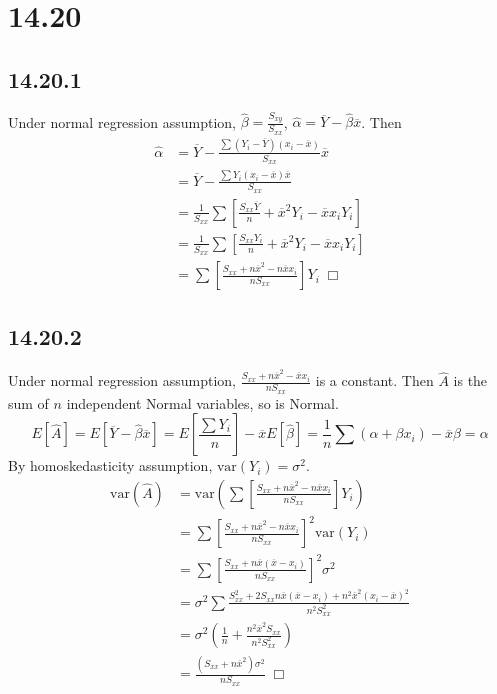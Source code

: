 \documentclass{article}
\begin{document}
\section*{14.20}
\subsection*{14.20.1}
Under normal regression assumption, $\hat{\beta} = \frac{S_{xy}}{S_{xx}}$, $\hat{\alpha} = \overline{Y} - \hat{\beta}\overline{x}$. Then
\begin{equation*}
\begin{split}
\hat{\alpha} &= \overline{Y} - \frac{\sum (Y_i-\overline{Y})(x_i-\overline{x})}{S_{xx}}\overline{x}\\
&= \overline{Y} - \frac{\sum Y_i(x_i-\overline{x})\overline{x}}{S_{xx}}\\
&= \frac{1}{S_{xx}}\sum \left[\frac{S_{xx}\overline{Y}}{n} +\overline{x}^2Y_i - \overline{x}x_iY_i \right]\\
&= \frac{1}{S_{xx}}\sum \left[\frac{S_{xx}Y_i}{n} +\overline{x}^2Y_i - \overline{x}x_iY_i \right]\\
&= \sum \left[\frac{S_{xx} + n\overline{x}^2 - n\overline{x}x_i}{nS_{xx}}\right]Y_i \; \Box
\end{split}
\end{equation*}
\subsection*{14.20.2}
Under normal regression assumption, $\frac{S_{xx} + n\overline{x}^2 - \overline{x}x_i}{nS_{xx}}$ is a constant. Then $\hat{A}$ is the sum of $n$ independent Normal variables, so is Normal.
$$E[\hat{A}] = E[\overline{Y}-\hat{\beta}\overline{x}] = E\left[\frac{\sum Y_i}{n}\right] - \overline{x}E[\hat{\beta}] = \frac{1}{n}\sum (\alpha + \beta x_i) - \overline{x}\beta = \alpha$$
By homoskedasticity assumption, $\mathrm{var}(Y_i) = \sigma^2$.
\begin{equation*}
\begin{split}
\mathrm{var}(\hat{A}) &= \mathrm{var}\left(\sum \left[\frac{S_{xx} + n\overline{x}^2 - n\overline{x}x_i}{nS_{xx}}\right]Y_i\right)\\
&= \sum \left[\frac{S_{xx} + n\overline{x}^2 - n\overline{x}x_i}{nS_{xx}}\right]^2 \mathrm{var}(Y_i)\\
&= \sum \left[\frac{S_{xx} + n\overline{x}(\overline{x}-x_i)}{nS_{xx}}\right]^2 \sigma^2\\
&= \sigma^2 \sum \frac{S_{xx}^2 + 2S_{xx}n\overline{x}(\overline{x}-x_i)+n^2\overline{x}^2(x_i-\overline{x})^2}{n^2S_{xx}^2}\\
&= \sigma^2 \left(\frac{1}{n} + \frac{n^2\overline{x}^2 S_{xx}}{n^2 S_{xx}^2}\right)\\
&= \frac{(S_{xx}+n\overline{x}^2)\sigma^2}{nS_{xx}} \;\Box
\end{split}
\end{equation*}
\end{document}
